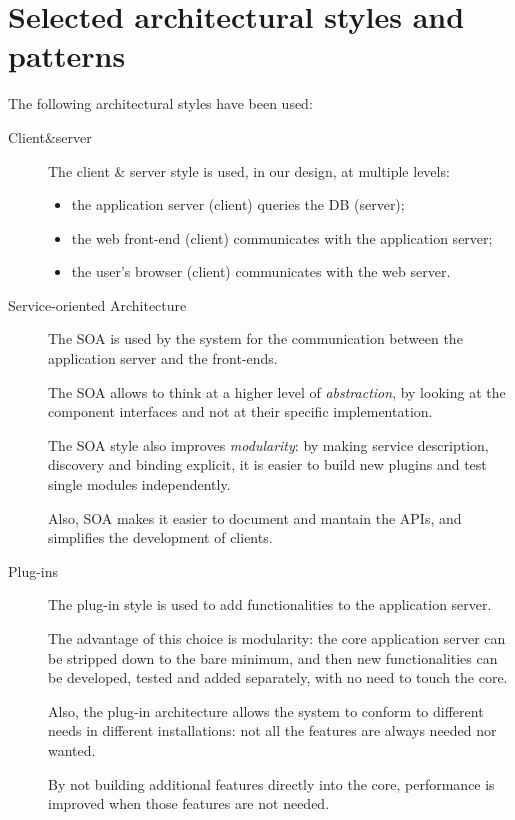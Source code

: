 \section{Selected architectural styles and patterns}
\label{sec:styles-patterns}

The following architectural styles have been used:

\begin{description}
\item[Client\&server]
The client \& server style is used, in our design, at multiple levels:
\begin{itemize}
    \item the application server (client) queries the DB (server);
    \item the web front-end (client) communicates with the application server;
    \item the user's browser (client) communicates with the web server.
\end{itemize}

\item[Service-oriented Architecture]
The SOA is used by the system for the communication between the application server and the front-ends.

The SOA allows to think at a higher level of \emph{abstraction}, by looking at the component interfaces and not at their specific implementation.

The SOA style also improves \emph{modularity}: by making service description, discovery and binding explicit, it is easier to build new plugins and test single modules independently.

Also, SOA makes it easier to document and mantain the APIs, and simplifies the development of clients.

\item[Plug-ins]
The plug-in style is used to add functionalities to the application server.

The advantage of this choice is modularity: the core application server can be stripped down to the bare minimum, and then new functionalities can be developed, tested and added separately, with no need to touch the core.

Also, the plug-in architecture allows the system to conform to different needs in different installations: not all the features are always needed nor wanted.

By not building additional features directly into the core, performance is improved when those features are not needed.


\end{description}
